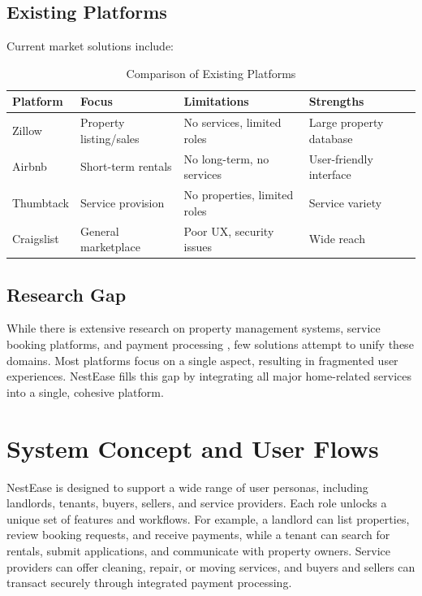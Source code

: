 \documentclass[conference]{IEEEtran}
\begin{document}
\subsection{Existing Platforms}
Current market solutions include:

\begin{table}[ht]
\centering
\caption{Comparison of Existing Platforms}
\begin{tabular}{|l|l|l|l|}
\hline
\textbf{Platform} & \textbf{Focus} & \textbf{Limitations} & \textbf{Strengths} \\
\hline
Zillow & Property listing/sales & No services, limited roles & Large property database \\
\hline
Airbnb & Short-term rentals & No long-term, no services & User-friendly interface \\
\hline
Thumbtack & Service provision & No properties, limited roles & Service variety \\
\hline
Craigslist & General marketplace & Poor UX, security issues & Wide reach \\
\hline
\end{tabular}
\end{table}

\subsection{Research Gap}
While there is extensive research on property management systems, service booking platforms, and payment processing \cite{real_estate_platforms}, few solutions attempt to unify these domains. Most platforms focus on a single aspect, resulting in fragmented user experiences. NestEase fills this gap by integrating all major home-related services into a single, cohesive platform.

\section{System Concept and User Flows}
NestEase is designed to support a wide range of user personas, including landlords, tenants, buyers, sellers, and service providers. Each role unlocks a unique set of features and workflows. For example, a landlord can list properties, review booking requests, and receive payments, while a tenant can search for rentals, submit applications, and communicate with property owners. Service providers can offer cleaning, repair, or moving services, and buyers and sellers can transact securely through integrated payment processing.
\end{document}
